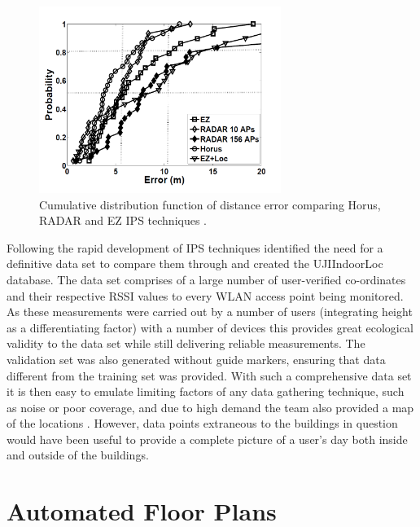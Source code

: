 \documentclass{UoYCSproject}
\begin{document}
                \begin{figure}[h]
                    \label{fig:EZHorusRADARComparison}
                    \caption{Cumulative distribution function of distance error comparing Horus, RADAR and EZ IPS techniques \citep{chintalapudi2010indoor}.}
                    \centering
                        \includegraphics[width=0.7\textwidth]{EZHorusRADARComparison.png}
                \end{figure}
                
                Following the rapid development of IPS techniques \citet{torres2014ujiindoorloc} identified the need for a definitive data set to compare them through and created the UJIIndoorLoc database. The data set comprises of a large number of user-verified co-ordinates and their respective RSSI values to every WLAN access point being monitored. As these measurements were carried out by a number of users (integrating height as a differentiating factor) with a number of devices this provides great ecological validity to the data set while still delivering reliable measurements. The validation set was also generated without guide markers, ensuring that data different from the training set was provided. With such a comprehensive data set it is then easy to emulate limiting factors of any data gathering technique, such as noise or poor coverage, and due to high demand the team also provided a map of the locations \citep{UJIIndoorLocMap}. However, data points extraneous to the buildings in question would have been useful to provide a complete picture of a user's day both inside and outside of the buildings.
            
        \section{Automated Floor Plans}
        \label{sec:floorplans}
        
\end{document}
